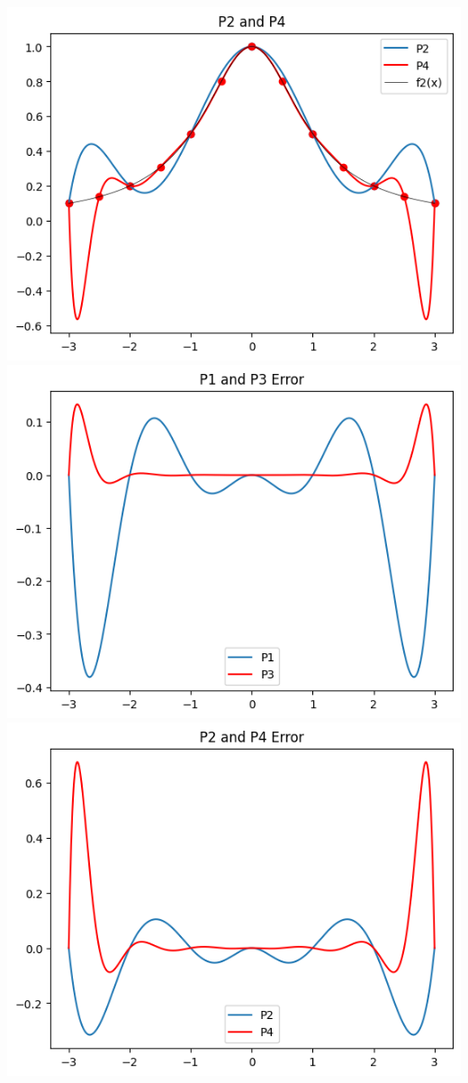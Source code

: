 \documentclass[12pt,twoside]{amsart}
\begin{document}
\begin{enumerate}
\begin{enumerate}
\begin{paracol}{2}
            \includegraphics[scale=0.45]{../img/problem6P2P4.png}
        \switchcolumn
            \includegraphics[scale=0.45]{../img/problem6P1P3error.png} \\
            \includegraphics[scale=0.45]{../img/problem6P2P4error.png}

\end{paracol}
\end{enumerate}
\end{enumerate}
\end{document}
